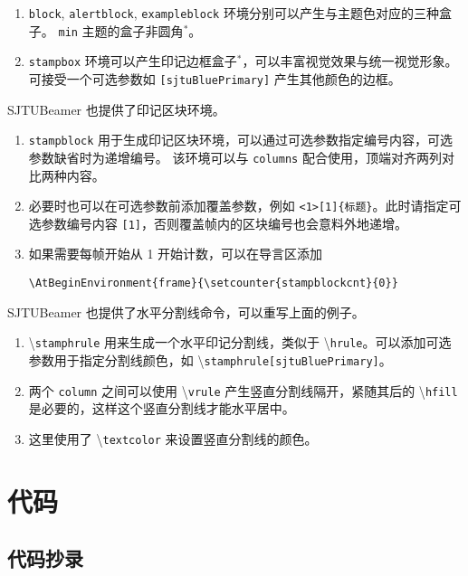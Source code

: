 \documentclass[
    UTF8,
    heading=true,
    12pt,
    a4paper
]{ctexrep}
\newenvironment{commentlist}
{\begin{enumerate}\small}
{\end{enumerate}}
\newcommand{\cmd}[1]{\textbackslash{}\texttt{#1}}
\newcommand{\env}[1]{\texttt{#1}}
\newcommand{\opt}[1]{\texttt{#1}}
\def\themename{\textsf{SJTUBeamer}}
\begin{document}
\begin{commentlist}
  \item \env{block}, \env{alertblock},
  \env{exampleblock}
  环境分别可以产生与主题色对应的三种盒子。
  \opt{min} 主题的盒子非圆角$^*$。
  \item \env{stampbox}
  环境可以产生印记边框盒子$^*$，可以丰富视觉效果与统一视觉形象。
  可接受一个可选参数如 \opt{[sjtuBluePrimary]} 产生其他颜色的边框。
\end{commentlist}

\themename{} 也提供了印记区块环境。


\begin{commentlist}
  \item \env{stampblock}
  用于生成印记区块环境，可以通过可选参数指定编号内容，可选参数缺省时为递增编号。
  该环境可以与 \env{columns} 配合使用，顶端对齐两列对比两种内容。
  \item 必要时也可以在可选参数前添加覆盖参数，例如
  \verb"<1>[1]{标题}"。此时请指定可选参数编号内容
  \verb"[1]"，否则覆盖帧内的区块编号也会意料外地递增。
  \item 如果需要每帧开始从 1 开始计数，可以在导言区添加
  \begin{verbatim}
\AtBeginEnvironment{frame}{\setcounter{stampblockcnt}{0}}
  \end{verbatim}
\end{commentlist}

\clearpage

\themename{} 也提供了水平分割线命令，可以重写上面的例子。


\begin{commentlist}
  \item \cmd{stamphrule} 用来生成一个水平印记分割线，类似于
  \cmd{hrule}。可以添加可选参数用于指定分割线颜色，如
  \cmd{stamphrule[sjtuBluePrimary]}。
  \item 两个 \env{column} 之间可以使用 \cmd{vrule}
  产生竖直分割线隔开，紧随其后的 \cmd{hfill}
  是必要的，这样这个竖直分割线才能水平居中。
  \item 这里使用了 \cmd{textcolor} 来设置竖直分割线的颜色。
\end{commentlist}

\chapter{代码}

\section{代码抄录}
\end{document}
